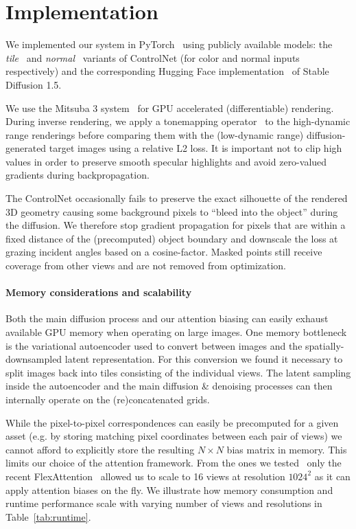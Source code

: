 
\section{Implementation}
\label{sec:implementation}



We implemented our system in PyTorch~\cite{pytorch} using publicly available models: the \textit{tile}~\cite{controlnet_tile} and \textit{normal}~\cite{controlnet_normal} variants of ControlNet (for color and normal inputs respectively) and the corresponding Hugging Face implementation~\cite{huggingface} of Stable Diffusion 1.5.%


We use the Mitsuba 3 system~\cite{mitsuba} for GPU accelerated (differentiable) rendering.
During inverse rendering, we apply a tonemapping operator~\cite{Reinhard2002} to the high-dynamic range renderings before comparing them with the (low-dynamic range) diffusion-generated target images using a relative L2 loss.
It is important not to clip high values in order to preserve smooth specular highlights and avoid zero-valued gradients during backpropagation.

The ControlNet occasionally fails to preserve the exact silhouette of the rendered 3D geometry causing some background pixels to ``bleed into the object'' during the diffusion. We therefore stop gradient propagation for pixels that are within a fixed distance of the (precomputed) object boundary and downscale the loss at grazing incident angles based on a cosine-factor. Masked points still receive coverage from other views and are not removed from optimization.

\paragraph{Memory considerations and scalability}

Both the main diffusion process and our attention biasing can easily exhaust available GPU memory when operating on large images. 
One memory bottleneck is the variational autoencoder used to convert between images and the spatially-downsampled latent representation. For this conversion we found it necessary to split images back into tiles consisting of the individual views. The latent sampling inside the autoencoder and the main diffusion \& denoising processes can then internally operate on the (re)concatenated grids.

While the pixel-to-pixel correspondences
can easily be precomputed for a given asset (e.g. by storing matching pixel coordinates between each pair of views) we cannot afford to explicitly store the resulting $N\times N$ bias matrix in memory.
This limits our choice of the attention framework. From the ones we tested~\cite{xFormers,flashattention,flashattention2,memeffattention,memeffattention2} only the recent FlexAttention~\cite{flexattention} allowed us to scale to 16 views at resolution $1024^2$ as it can apply attention biases on the fly.
We illustrate how memory consumption and runtime performance scale with varying number of views and resolutions in Table~\ref{tab:runtime}.










